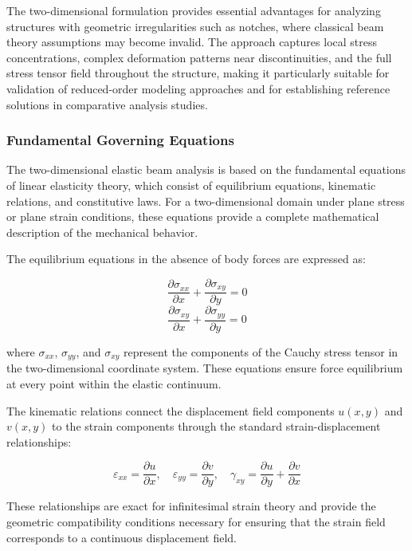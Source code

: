 \documentclass[12pt,a4paper]{report}
\begin{document}
The two-dimensional formulation provides essential advantages for analyzing structures with geometric irregularities such as notches, where classical beam theory assumptions may become invalid. The approach captures local stress concentrations, complex deformation patterns near discontinuities, and the full stress tensor field throughout the structure, making it particularly suitable for validation of reduced-order modeling approaches and for establishing reference solutions in comparative analysis studies.

\subsubsection{Fundamental Governing Equations}

The two-dimensional elastic beam analysis is based on the fundamental equations of linear elasticity theory, which consist of equilibrium equations, kinematic relations, and constitutive laws. For a two-dimensional domain under plane stress or plane strain conditions, these equations provide a complete mathematical description of the mechanical behavior.

The equilibrium equations in the absence of body forces are expressed as:

\begin{equation}
\frac{\partial \sigma_{xx}}{\partial x} + \frac{\partial \sigma_{xy}}{\partial y} = 0
\end{equation}
\begin{equation}
\frac{\partial \sigma_{xy}}{\partial x} + \frac{\partial \sigma_{yy}}{\partial y} = 0
\end{equation}

where $\sigma_{xx}$, $\sigma_{yy}$, and $\sigma_{xy}$ represent the components of the Cauchy stress tensor in the two-dimensional coordinate system. These equations ensure force equilibrium at every point within the elastic continuum.

The kinematic relations connect the displacement field components $u(x,y)$ and $v(x,y)$ to the strain components through the standard strain-displacement relationships:

\begin{equation}
\varepsilon_{xx} = \frac{\partial u}{\partial x}, \quad
\varepsilon_{yy} = \frac{\partial v}{\partial y}, \quad
\gamma_{xy} = \frac{\partial u}{\partial y} + \frac{\partial v}{\partial x}
\end{equation}

These relationships are exact for infinitesimal strain theory and provide the geometric compatibility conditions necessary for ensuring that the strain field corresponds to a continuous displacement field.
\end{document}
